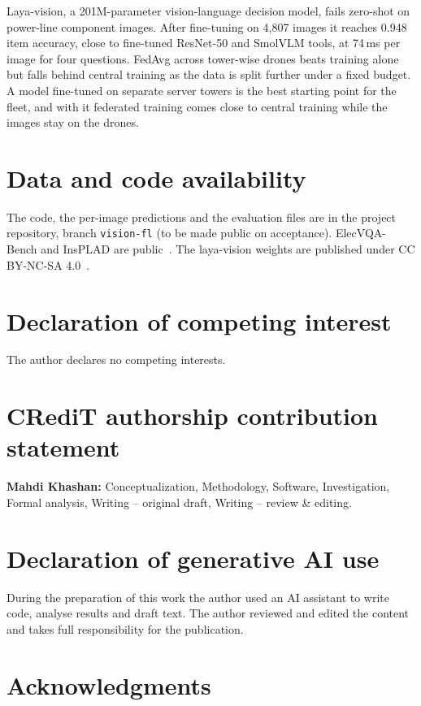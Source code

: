 \documentclass[preprint,12pt]{elsarticle}
\begin{document}
Laya-vision, a 201M-parameter vision-language decision model, fails zero-shot on power-line component images. After fine-tuning on 4,807 images it reaches 0.948 item accuracy, close to fine-tuned ResNet-50 and SmolVLM tools, at 74\,ms per image for four questions. FedAvg across tower-wise drones beats training alone but falls behind central training as the data is split further under a fixed budget. A model fine-tuned on separate server towers is the best starting point for the fleet, and with it federated training comes close to central training while the images stay on the drones.

\section*{Data and code availability}

The code, the per-image predictions and the evaluation files are in the project repository, branch \texttt{vision-fl} (to be made public on acceptance). ElecVQA-Bench and InsPLAD are public~\cite{elecvqa,insplad}. The laya-vision weights are published under CC BY-NC-SA 4.0~\cite{layavision}.

\section*{Declaration of competing interest}

The author declares no competing interests.

\section*{CRediT authorship contribution statement}

\textbf{Mahdi Khashan:} Conceptualization, Methodology, Software, Investigation, Formal analysis, Writing -- original draft, Writing -- review \& editing.

\section*{Declaration of generative AI use}

During the preparation of this work the author used an AI assistant to write code, analyse results and draft text. The author reviewed and edited the content and takes full responsibility for the publication.

\section*{Acknowledgments}
\end{document}
